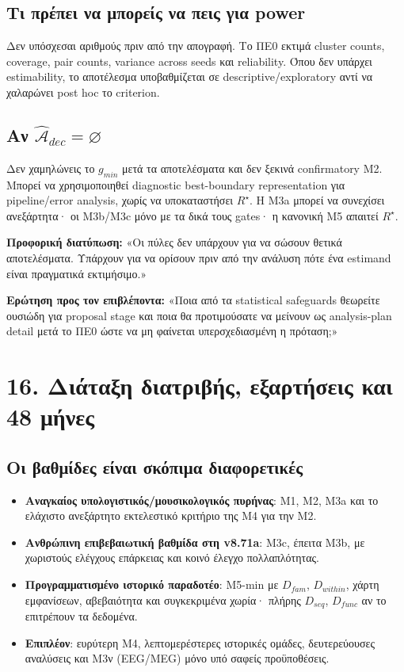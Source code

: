 \documentclass[9pt,a4paper]{extarticle}
\newcommand{\say}[1]{\begin{keybox}\textbf{Προφορική διατύπωση:} #1\end{keybox}}
\newcommand{\ask}[1]{\begin{warnbox}\textbf{Ερώτηση προς τον επιβλέποντα:} #1\end{warnbox}}
\begin{document}
\subsection*{Τι πρέπει να μπορείς να πεις για power}
Δεν υπόσχεσαι αριθμούς πριν από την απογραφή. Το ΠΕ0 εκτιμά cluster counts, coverage, pair counts, variance across seeds και reliability. Όπου δεν υπάρχει estimability, το αποτέλεσμα υποβαθμίζεται σε descriptive/exploratory αντί να χαλαρώνει post hoc το criterion.

\subsection*{Αν \(\widehat{\mathcal A}_{dec}=\varnothing\)}
Δεν χαμηλώνεις το \(g_{min}\) μετά τα αποτελέσματα και δεν ξεκινά confirmatory M2. Μπορεί να χρησιμοποιηθεί diagnostic best-boundary representation για pipeline/error analysis, χωρίς να υποκαταστήσει \(R^\star\). Η M3a μπορεί να συνεχίσει ανεξάρτητα· οι M3b/M3c μόνο με τα δικά τους gates· η κανονική M5 απαιτεί \(R^\star\).

\say{«Οι πύλες δεν υπάρχουν για να σώσουν θετικά αποτελέσματα. Υπάρχουν για να ορίσουν πριν από την ανάλυση πότε ένα estimand είναι πραγματικά εκτιμήσιμο.»}

\ask{«Ποια από τα statistical safeguards θεωρείτε ουσιώδη για proposal stage και ποια θα προτιμούσατε να μείνουν ως analysis-plan detail μετά το ΠΕ0 ώστε να μη φαίνεται υπερσχεδιασμένη η πρόταση;»}

\newpage
\section*{16. Διάταξη διατριβής, εξαρτήσεις και 48 μήνες}
\subsection*{Οι βαθμίδες είναι σκόπιμα διαφορετικές}
\begin{itemize}
\item \textbf{Αναγκαίος υπολογιστικός/μουσικολογικός πυρήνας}: M1, M2, M3a και το ελάχιστο ανεξάρτητο εκτελεστικό κριτήριο της M4 για την M2.
\item \textbf{Ανθρώπινη επιβεβαιωτική βαθμίδα στη v8.71a}: M3c, έπειτα M3b, με χωριστούς ελέγχους επάρκειας και κοινό έλεγχο πολλαπλότητας.
\item \textbf{Προγραμματισμένο ιστορικό παραδοτέο}: M5-min με \(D_{fam}\), \(D_{within}\), χάρτη εμφανίσεων, αβεβαιότητα και συγκεκριμένα χωρία· πλήρης \(D_{seq}\), \(D_{func}\) αν το επιτρέπουν τα δεδομένα.
\item \textbf{Επιπλέον}: ευρύτερη M4, λεπτομερέστερες ιστορικές ομάδες, δευτερεύουσες αναλύσεις και M3ν (EEG/MEG) μόνο υπό σαφείς προϋποθέσεις.
\end{itemize}
\end{document}
